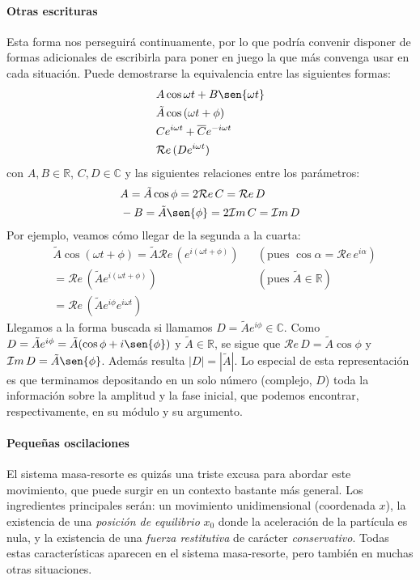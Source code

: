 \documentclass[a4paper,spanish]{article}
\def\Rea {\mathcal{R}e}
\def\Ima {\mathcal{I}m}
\def\C {\mathbb{C}}
\def\R {\mathbb{R}}
\numberwithin{equation}{section}
\begin{document}
\paragraph{Otras escrituras} Esta forma nos perseguirá continuamente, por lo que podría convenir disponer de formas adicionales de escribirla para poner en juego la que más convenga usar en cada situación. Puede demostrarse la equivalencia entre las siguientes formas:
		\begin{align*}
			& A \cos{\omega t} + B \sen{\omega t}\\
			& \tilde{A} \cos{(\omega t + \phi)}\\
			& C e^{i\omega t} + \overline{C} e^{-i\omega t}\\
			& \Rea{\,(D e^{i\omega t})}
		\end{align*}
con $A,B\in\R$, $C,D\in\C$ y las siguientes relaciones entre los parámetros:
		\begin{align*}
			& A = \tilde{A} \cos{\phi} = 2\Rea{\,C} = \Rea{\,D}\\
			& -B = \tilde{A} \sen{\phi} = 2\Ima{\,C} = \Ima{\,D}
		\end{align*}
Por ejemplo, veamos cómo llegar de la segunda a la cuarta:
		\begin{align*}
			& \tilde{A} \cos{(\omega t + \phi)} = \tilde{A} \Rea{\,(e^{i(\omega t +\phi)})}
				& & (\text{pues } \cos{\alpha}=\Rea{\,e^{i\alpha}})\\
			& = \Rea{\,(\tilde{A} e^{i(\omega t + \phi)})}
				& & (\text{pues } \tilde{A}\in\R)\\
			& = \Rea{\,(\tilde{A} e^{i\phi} e^{i\omega t})}
		\end{align*}
Llegamos a la forma buscada si llamamos $D = \tilde{A} e^{i\phi} \in\C$. Como $D = \tilde{A} e^{i\phi}= \tilde{A} (\cos{\phi} + i\sen{\phi})$ y $\tilde{A} \in\R$, se sigue que $\Rea{\,D} = \tilde{A} \cos{\phi}$ y $\Ima{\,D} = \tilde{A} \sen{\phi}$. Además resulta $|D|=|\tilde{A}|$. Lo especial de esta representación es que terminamos depositando en un solo número (complejo, $D$) toda la información sobre la amplitud y la fase inicial, que podemos encontrar, respectivamente, en su módulo y su argumento.

\paragraph{Peque\~nas oscilaciones} El sistema masa-resorte es quiz\'as una triste excusa para abordar este movimiento, que puede surgir en un contexto bastante m\'as general. Los ingredientes principales ser\'an: un movimiento unidimensional (coordenada $x$), la existencia de una \textit{posici\'on de equilibrio} $x_0$ donde la aceleraci\'on de la part\'icula es nula, y la existencia de una \textit{fuerza restitutiva} de car\'acter \textit{conservativo}. Todas estas caracter\'isticas aparecen en el sistema masa-resorte, pero tambi\'en en muchas otras situaciones.
\end{document}
